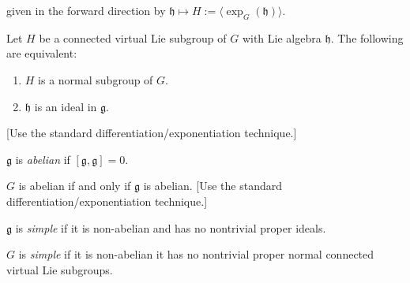 \documentclass[reqno]{amsart} 
\begin{document}
given in the forward direction by $\mathfrak{h} \mapsto H := \langle \exp_G(\mathfrak{h}) \rangle$.
\begin{exercise}\label{exe:normal-vs-ideal}
  Let $H$ be a connected virtual Lie subgroup of $G$ with Lie algebra $\mathfrak{h}$.  The following are equivalent:
  \begin{enumerate}
  \item $H$ is a normal subgroup of $G$.
  \item $\mathfrak{h}$ is an ideal in $\mathfrak{g}$.
  \end{enumerate}
 [Use the standard differentiation/exponentiation technique.]
\end{exercise}
\begin{definition}
  $\mathfrak{g}$ is \emph{abelian} if $[\mathfrak{g},\mathfrak{g}]=0$.
\end{definition}
\begin{exercise}\label{exe:abelian-lie-alg-lie-gp}
  $G$ is abelian if and only if $\mathfrak{g}$ is abelian.  [Use the standard differentiation/exponentiation technique.]
\end{exercise}

\begin{definition}
  $\mathfrak{g}$ is \emph{simple} if it is non-abelian and has no nontrivial proper ideals.
\end{definition}


\begin{definition}
  $G$ is \emph{simple} if it is non-abelian it has no nontrivial proper normal connected virtual Lie subgroups.
\end{definition}
\end{document}
